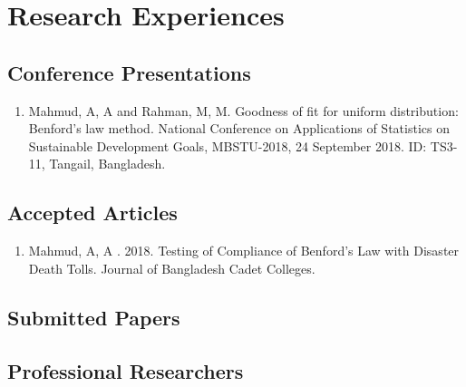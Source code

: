 \documentclass[
]{book}
\providecommand{\tightlist}{%
  \setlength{\itemsep}{0pt}\setlength{\parskip}{0pt}}
\begin{document}
\hypertarget{research-experiences}{%
\section*{Research Experiences}\label{research-experiences}}

\hypertarget{conference-presentations}{%
\subsection*{Conference Presentations}\label{conference-presentations}}

\begin{enumerate}
\def\labelenumi{\arabic{enumi}.}
\tightlist
\item
  Mahmud, A, A and Rahman, M, M. Goodness of fit for uniform distribution:
  Benford's law method. National Conference on Applications of Statistics on
  Sustainable Development Goals, MBSTU-2018, 24 September 2018. ID: TS3-11,
  Tangail, Bangladesh.
\end{enumerate}

\hypertarget{accepted-articles}{%
\subsection*{Accepted Articles}\label{accepted-articles}}

\begin{enumerate}
\def\labelenumi{\arabic{enumi}.}
\tightlist
\item
  Mahmud, A, A . 2018. Testing of Compliance of Benford's Law with Disaster
  Death Tolls. Journal of Bangladesh Cadet Colleges.
\end{enumerate}

\hypertarget{submitted-papers}{%
\subsection*{Submitted Papers}\label{submitted-papers}}

\hypertarget{professional-researchers}{%
\subsection*{Professional Researchers}\label{professional-researchers}}
\end{document}
